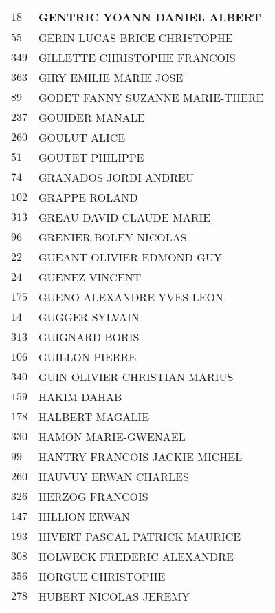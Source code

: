 \begin{xltabular}{\linewidth}{|l|X|}
    \hline
    $18$ & GENTRIC YOANN DANIEL ALBERT \\
    \hline
    $55$ & GERIN LUCAS BRICE CHRISTOPHE \\
    \hline
    $349$ & GILLETTE CHRISTOPHE FRANCOIS \\
    \hline
    $363$ & GIRY EMILIE MARIE JOSE \\
    \hline
    $89$ & GODET FANNY SUZANNE MARIE-THERE \\
    \hline
    $237$ & GOUIDER MANALE \\
    \hline
    $260$ & GOULUT ALICE \\
    \hline
    $51$ & GOUTET PHILIPPE \\
    \hline
    $74$ & GRANADOS JORDI ANDREU \\
    \hline
    $102$ & GRAPPE ROLAND \\
    \hline
    $313$ & GREAU DAVID CLAUDE MARIE \\
    \hline
    $96$ & GRENIER-BOLEY NICOLAS \\
    \hline
    $22$ & GUEANT OLIVIER EDMOND GUY \\
    \hline
    $24$ & GUENEZ VINCENT \\
    \hline
    $175$ & GUENO ALEXANDRE YVES LEON \\
    \hline
    $14$ & GUGGER SYLVAIN \\
    \hline
    $313$ & GUIGNARD BORIS \\
    \hline
    $106$ & GUILLON PIERRE \\
    \hline
    $340$ & GUIN OLIVIER CHRISTIAN MARIUS \\
    \hline
    $159$ & HAKIM DAHAB \\
    \hline
    $178$ & HALBERT MAGALIE \\
    \hline
    $330$ & HAMON MARIE-GWENAEL \\
    \hline
    $99$ & HANTRY FRANCOIS JACKIE MICHEL \\
    \hline
    $260$ & HAUVUY ERWAN CHARLES \\
    \hline
    $326$ & HERZOG FRANCOIS \\
    \hline
    $147$ & HILLION ERWAN \\
    \hline
    $193$ & HIVERT PASCAL PATRICK MAURICE \\
    \hline
    $308$ & HOLWECK FREDERIC ALEXANDRE \\
    \hline
    $356$ & HORGUE CHRISTOPHE \\
    \hline
    $278$ & HUBERT NICOLAS JEREMY \\

\end{xltabular}
